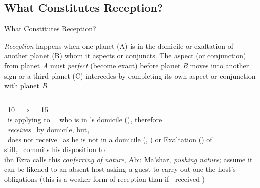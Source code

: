 \subsection{What Constitutes Reception?}
\begin{frame}[t]{What Constitutes Reception?}
\small
\begin{block}{}
\textsl{Reception} happens when one planet (A) is in the domicile or exaltation of another planet (B) whom it aspects or conjuncts. The aspect (or conjunction) from planet \textsl{A} must \textsl{perfect} (become exact)  before planet \textsl{B} moves into another sign or a third planet (C) intercedes by completing its own aspect or conjunction with planet \textsl{B}.
\end{block}

\vspace{0.1cm}
\begin{columns}[T, onlytextwidth]
\Mars\ 10 \Aries\ $\Rightarrow$ \Conjunction\ \Saturn\ 15 \Aries \\
\ul
\vspace{0.2cm}
\Mars\ is applying to \Conjunction\ \Saturn\ who is in \Mars's domicile (\Aries), therefore\\
\Mars\ \textsl{receives} \Saturn\ by domicile, but, \\
\Saturn\ does not receive \Mars\ as he is not in a domicile (\Capricorn, \Aquarius) or Exaltation (\Libra) of \Saturn \\
still, \Mars\ commits his disposition to \Saturn \\
\vspace{0.2cm}
ibn Ezra calls this \textsl{conferring of nature}, Abu Ma'shar, \textsl{pushing nature}; assume it can be likened to an absent host asking a guest to carry out one the host's obligations (this is a weaker form of reception than if \Saturn\ received \Mars)


\end{columns}
\end{frame}
